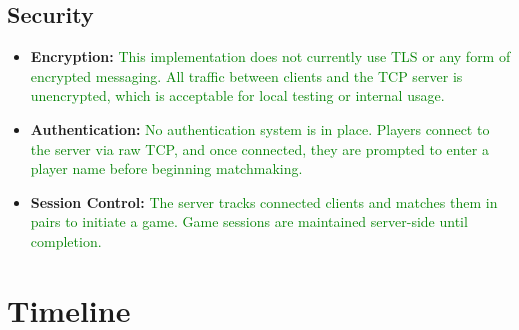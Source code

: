 \documentclass[12pt, titlepage]{article}
\newcommand{\added}[1]{\textcolor{green}{#1}}
\begin{document}
\subsection{Security}
\begin{itemize}
    \item \textbf{Encryption:} \added{This implementation does not currently use TLS or any form of encrypted messaging. All traffic between clients and the TCP server is unencrypted, which is acceptable for local testing or internal usage.}
    \item \textbf{Authentication:} \added{No authentication system is in place. Players connect to the server via raw TCP, and once connected, they are prompted to enter a player name before beginning matchmaking.}
    \item \textbf{Session Control:} \added{The server tracks connected clients and matches them in pairs to initiate a game. Game sessions are maintained server-side until completion.}
\end{itemize}

\section{Timeline}
\end{document}
